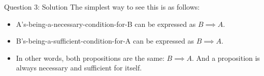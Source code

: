 \documentclass[10pt]{beamer}
\begin{document}
\begin{frame}{Question 3: Solution}
The simplest way to see this is as follows:
\begin{itemize}
\item A's-being-a-necessary-condition-for-B can be expressed as $B \implies A$.
\item B's-being-a-sufficient-condition-for-A can be expressed as $B \implies A$. 
\item In other words, both propositions are the same: $B \implies A$. And a proposition is always necessary and sufficient for itself.  
\end{itemize}

\end{frame}
\end{document}

